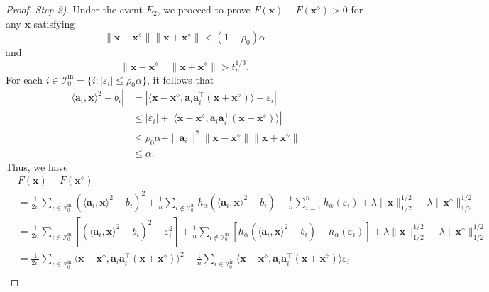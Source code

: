 \documentclass{article}
\numberwithin{equation}{section}
\begin{document}
\begin{proof}
	\textit{Step 2)}. Under the event $E_2$, we proceed to prove $F(\mathbf{x})-F(\mathbf{x}^\diamond)>0$ for any $\mathbf{x}$ satisfying
	$$\|\mathbf{x}-\mathbf{x}^\diamond\|\|\mathbf{x}+\mathbf{x}^\diamond\|<  (1-\rho_0)\alpha$$
	and 
	$$\|\mathbf{x}-\mathbf{x}^\diamond\| \|\mathbf{x}+\mathbf{x}^\diamond\|> t_n^{1/3}.
	$$
	For each $i\in\mathcal{I}_{0}^{\mathrm{in}}=\{i:|\varepsilon_i|\leq\rho_0\alpha\}$, it follows that
	\begin{equation}
		\begin{aligned}\label{index_in}
			|\langle \mathbf{a}_i,\mathbf{x}\rangle^2-b_i|&=|\langle \mathbf{x}-\mathbf{x}^\diamond, \mathbf{a}_i\mathbf{a}_i^\top(\mathbf{x}+\mathbf{x}^\diamond)\rangle-\varepsilon_i|\\
			&\leq|\varepsilon_i|+|\langle \mathbf{x}-\mathbf{x}^\diamond, \mathbf{a}_i\mathbf{a}_i^\top(\mathbf{x}+\mathbf{x}^\diamond)\rangle|\\
			&\leq\rho_0\alpha+\|\mathbf{a}_i\|^2\|\mathbf{x}-\mathbf{x}^\diamond\|\|\mathbf{x}+\mathbf{x}^\diamond\|\\
			&\leq\alpha.
		\end{aligned}
	\end{equation}
	Thus, we have
	\begin{equation}\label{FFr1}
		\begin{aligned}
			&F(\mathbf{x})-F(\mathbf{x}^\diamond)\\
			&=\frac{1}{2n}\sum_{i\in\mathcal{I}_{0}^{\mathrm{in}}}(\langle \mathbf{a}_i,\mathbf{x}\rangle^2-b_i)^2+\frac{1}{n}\sum_{i\notin\mathcal{I}_{0}^{\mathrm{in}}}
			h_{\alpha}(\langle \mathbf{a}_i,\mathbf{x}\rangle^2-b_i)-\frac{1}{n}\sum_{i=1}^n		h_{\alpha}(\varepsilon_i)+\lambda\|\mathbf{x}\|_{1/2}^{1/2}-\lambda\|\mathbf{x}^\diamond\|_{1/2}^{1/2}\\
			&=\frac{1}{2n}\sum_{i\in\mathcal{I}_{0}^{\mathrm{in}}}[(\langle \mathbf{a}_i,\mathbf{x}\rangle^2-b_i)^2-	\varepsilon_i^2]+\frac{1}{n}\sum_{i\notin\mathcal{I}_{0}^{\mathrm{in}}}
			[h_{\alpha}(\langle \mathbf{a}_i,\mathbf{x}\rangle^2-b_i)-	h_{\alpha}(\varepsilon_i)]
			+\lambda\|\mathbf{x}\|_{1/2}^{1/2}-\lambda\|\mathbf{x}^\diamond\|_{1/2}^{1/2}\\
			&=\frac{1}{2n}\sum_{i\in\mathcal{I}_{0}^{\mathrm{in}}}\langle \mathbf{x}-\mathbf{x}^\diamond, \mathbf{a}_i\mathbf{a}_i^\top(\mathbf{x}+\mathbf{x}^\diamond)\rangle^2
			-\frac{1}{n}\sum_{i\in\mathcal{I}_{0}^{\mathrm{in}}}\langle \mathbf{x}-\mathbf{x}^\diamond, \mathbf{a}_i\mathbf{a}_i^\top(\mathbf{x}+\mathbf{x}^\diamond)\rangle\varepsilon_i\\

\end{aligned}
\end{equation}
\end{proof}
\end{document}
